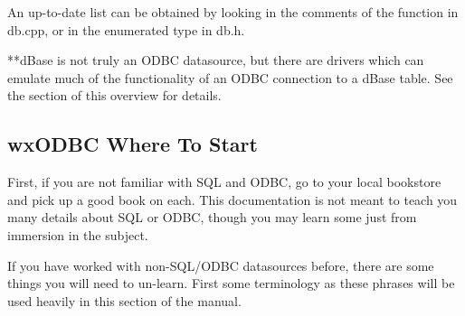 An up-to-date list can be obtained by looking in the comments of the function 
 in db.cpp, or in the enumerated type 
 in db.h.

**dBase is not truly an ODBC datasource, but there are drivers which can 
emulate much of the functionality of an ODBC connection to a dBase table. 
See the  section of this 
overview for details.


\subsection{wxODBC Where To Start}\label{wxodbcwheretostart}

First, if you are not familiar with SQL and ODBC, go to your local bookstore 
and pick up a good book on each. This documentation is not meant to teach 
you many details about SQL or ODBC, though you may learn some just from 
immersion in the subject.

If you have worked with non-SQL/ODBC datasources before, there are some 
things you will need to un-learn. First some terminology as these phrases will 
be used heavily in this section of the manual.


